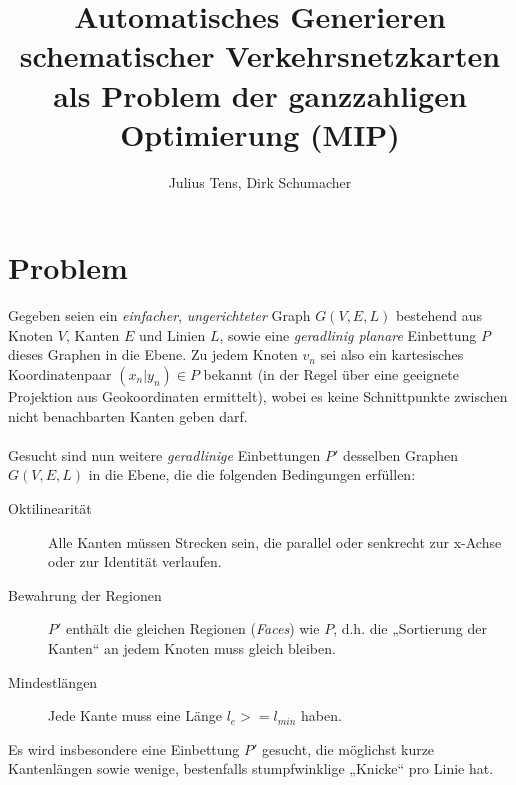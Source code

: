 \documentclass[a4paper,11pt]{amsart}
\title{Automatisches Generieren schematischer Verkehrsnetzkarten als Problem der ganzzahligen Optimierung (MIP)}
\author{Julius Tens, Dirk Schumacher}
\begin{document}
\maketitle

\section*{Problem}

\noindent Gegeben seien ein \textit{einfacher}, \textit{ungerichteter} Graph $G(V,E,L)$ bestehend aus Knoten $V$, Kanten $E$ und Linien $L$, sowie eine \textit{geradlinig planare} Einbettung $P$ dieses Graphen in die Ebene. Zu jedem Knoten $v_n$ sei also ein kartesisches Koordinatenpaar $(x_n | y_n) \in P$ bekannt (in der Regel über eine geeignete Projektion aus Geokoordinaten ermittelt), wobei es keine Schnittpunkte zwischen nicht benachbarten Kanten geben darf.
\\\\
Gesucht sind nun weitere \textit{geradlinige} Einbettungen $P'$ desselben Graphen $G(V,E,L)$ in die Ebene, die die folgenden Bedingungen erfüllen:
\bigskip

\begin{description}
\item[Oktilinearität] Alle Kanten müssen Strecken sein, die parallel oder senkrecht zur x-Achse oder zur Identität verlaufen.
\bigskip
\item[Bewahrung der Regionen] $P'$ enthält die gleichen Regionen (\textit{Faces}) wie $P$, d.h. die „Sortierung der Kanten“ an jedem Knoten muss gleich bleiben.
\bigskip
\item[Mindestlängen] Jede Kante muss eine Länge $l_e >= l_{min}$ haben.
\bigskip
\end{description}

\noindent Es wird insbesondere eine Einbettung $P'$ gesucht, die möglichst kurze Kantenlängen sowie wenige, bestenfalls stumpfwinklige „Knicke“ pro Linie hat.
\bigskip
\bigskip
\bigskip

\end{document}
